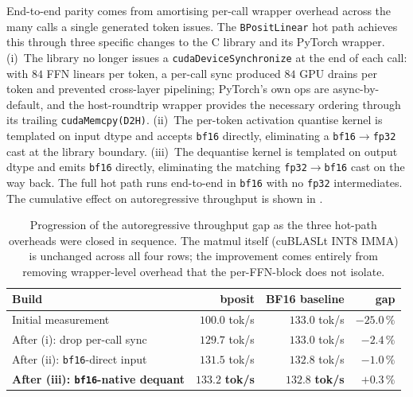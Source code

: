 \documentclass[11pt,a4paper]{article}
\begin{document}
End-to-end parity comes from amortising per-call wrapper overhead across
the many calls a single generated token issues. The \texttt{BPositLinear}
hot path achieves this through three specific changes to the C library
and its PyTorch wrapper. (i)~The library no longer issues a
\texttt{cudaDeviceSynchronize} at the end of each call: with $84$ FFN
linears per token, a per-call sync produced $84$ GPU drains per token
and prevented cross-layer pipelining; PyTorch's own ops are
async-by-default, and the host-roundtrip wrapper provides the necessary
ordering through its trailing \texttt{cudaMemcpy(D2H)}. (ii)~The
per-token activation quantise kernel is templated on input dtype and
accepts \texttt{bf16} directly, eliminating a \texttt{bf16}$\rightarrow$\texttt{fp32}
cast at the library boundary. (iii)~The dequantise kernel is templated
on output dtype and emits \texttt{bf16} directly, eliminating the
matching \texttt{fp32}$\rightarrow$\texttt{bf16} cast on the way back.
The full hot path runs end-to-end in \texttt{bf16} with no \texttt{fp32}
intermediates. The cumulative effect on autoregressive throughput is
shown in .

\begin{table}[h]
\centering
\begin{tabular}{@{}lrrr@{}}
\toprule
Build                                   & bposit       & BF16 baseline & gap \\
\midrule
Initial measurement                     & $100.0$ tok/s & $133.0$ tok/s & $-25.0\,\%$ \\
After (i): drop per-call sync           & $129.7$ tok/s & $133.0$ tok/s & $-2.4\,\%$  \\
After (ii): \texttt{bf16}-direct input  & $131.5$ tok/s & $132.8$ tok/s & $-1.0\,\%$  \\
\textbf{After (iii): \texttt{bf16}-native dequant} & $\mathbf{133.2}$ \textbf{tok/s} & $\mathbf{132.8}$ \textbf{tok/s} & $\mathbf{+0.3\,\%}$ \\
\bottomrule
\end{tabular}
\caption{Progression of the autoregressive throughput gap as the three
hot-path overheads were closed in sequence. The matmul itself
(cuBLASLt INT8 IMMA) is unchanged across all four rows; the
improvement comes entirely from removing wrapper-level overhead that
the per-FFN-block  does not isolate.}
\label{tab:e2e_progression}
\end{table}
\end{document}
